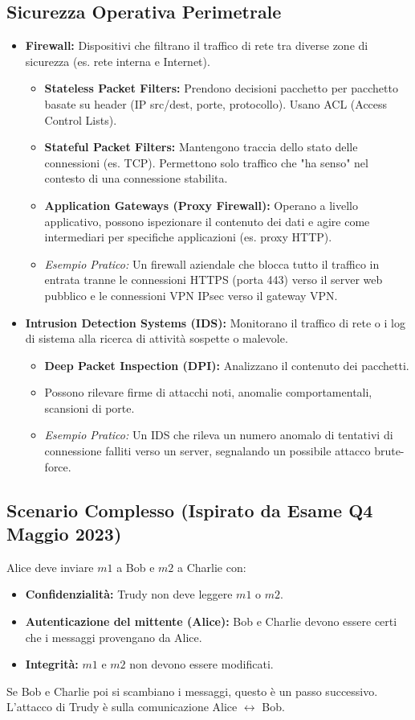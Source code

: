 \subsection{Sicurezza Operativa Perimetrale}
\begin{itemize}
    \item \textbf{Firewall:} Dispositivi che filtrano il traffico di rete tra diverse zone di sicurezza (es. rete interna e Internet).
    \begin{itemize}
        \item \textbf{Stateless Packet Filters:} Prendono decisioni pacchetto per pacchetto basate su header (IP src/dest, porte, protocollo). Usano ACL (Access Control Lists).
        \item \textbf{Stateful Packet Filters:} Mantengono traccia dello stato delle connessioni (es. TCP). Permettono solo traffico che "ha senso" nel contesto di una connessione stabilita.
        \item \textbf{Application Gateways (Proxy Firewall):} Operano a livello applicativo, possono ispezionare il contenuto dei dati e agire come intermediari per specifiche applicazioni (es. proxy HTTP).
        \item \emph{Esempio Pratico:} Un firewall aziendale che blocca tutto il traffico in entrata tranne le connessioni HTTPS (porta 443) verso il server web pubblico e le connessioni VPN IPsec verso il gateway VPN.
    \end{itemize}
    \item \textbf{Intrusion Detection Systems (IDS):} Monitorano il traffico di rete o i log di sistema alla ricerca di attività sospette o malevole.
    \begin{itemize}
        \item \textbf{Deep Packet Inspection (DPI):} Analizzano il contenuto dei pacchetti.
        \item Possono rilevare firme di attacchi noti, anomalie comportamentali, scansioni di porte.
        \item \emph{Esempio Pratico:} Un IDS che rileva un numero anomalo di tentativi di connessione falliti verso un server, segnalando un possibile attacco brute-force.
    \end{itemize}
\end{itemize}

\subsection{Scenario Complesso (Ispirato da Esame Q4 Maggio 2023)}
Alice deve inviare $m1$ a Bob e $m2$ a Charlie con:
\begin{itemize}
    \item \textbf{Confidenzialità:} Trudy non deve leggere $m1$ o $m2$.
    \item \textbf{Autenticazione del mittente (Alice):} Bob e Charlie devono essere certi che i messaggi provengano da Alice.
    \item \textbf{Integrità:} $m1$ e $m2$ non devono essere modificati.
\end{itemize}
Se Bob e Charlie poi si scambiano i messaggi, questo è un passo successivo. L'attacco di Trudy è sulla comunicazione Alice $\leftrightarrow$ Bob.

